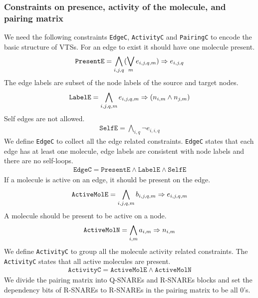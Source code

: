\subsubsection{Constraints on presence, activity of the molecule, and pairing matrix}
%
We need the following constraints \texttt{EdgeC},
\texttt{ActivityC} and \texttt{PairingC} to encode the basic structure of VTSs.
%
For an edge to exist it should have one molecule present. 
%
\begin{align*}
  \texttt{PresentE} = \bigwedge\limits_{i,j,q} (\bigvee_m e_{i,j,q,m} )\Rightarrow e_{i,j,q}
\end{align*}
The edge labels are subset of the node labels of the source and target nodes.
\begin{align*}
  \texttt{LabelE} = \bigwedge\limits_{i,j,q,m} e_{i,j,q,m} \Rightarrow (n_{i,m} \land n_{j,m} )
\end{align*}
Self edges are not allowed. 
\begin{align*}
  \texttt{SelfE} = \bigwedge\limits_{i,q} \neg e_{i,i,q}
\end{align*}
\noindent We define \texttt{EdgeC} to collect all the edge related constraints. 
%
\texttt{EdgeC} states that each edge has at least one molecule,
 edge labels are consistent with node labels and there are no self-loops.    
\begin{align*}
  \texttt{EdgeC} = \texttt{PresentE} \land \texttt{LabelE}  \land \texttt{SelfE} 
\end{align*}
\noindent If a molecule is active on an edge, it should be present on the edge.
%
\begin{align*}
  \texttt{ActiveMolE} = \bigwedge\limits_{i,j,q,m} b_{i,j,q,m} \Rightarrow e_{i,j,q,m}\label{eq:f1}
\end{align*}
A molecule should be present to be active on a node.  
\begin{align*}
    \texttt{ActiveMolN} = \bigwedge\limits_{i,m} a_{i,m} \Rightarrow n_{i,m}
\end{align*}
\noindent We define \texttt{ActivityC} to group all the molecule activity related constraints. 
The \texttt{ActivityC} states that all active molecules are present.
\begin{align*}
  \texttt{ActivityC} = \texttt{ActiveMolE} \land \texttt{ActiveMolN} 
\end{align*}
\noindent We divide the pairing matrix into Q-SNAREs and R-SNAREs blocks and set the dependency bits of R-SNAREs to R-SNAREs in the pairing matrix to be all 0's.

